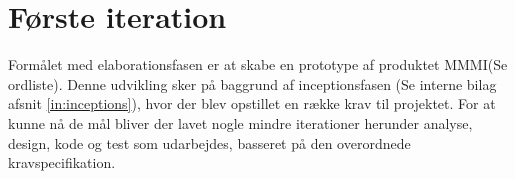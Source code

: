 \section{Første iteration}

Formålet med elaborationsfasen er at skabe en prototype af produktet MMMI(Se ordliste). Denne udvikling sker på baggrund af inceptionsfasen (Se interne bilag afsnit \ref{in:inceptions}), hvor der blev opstillet en række krav til projektet.  For at kunne nå de mål bliver der lavet nogle mindre iterationer herunder analyse, design, kode og test som udarbejdes, basseret på den overordnede kravspecifikation. 








